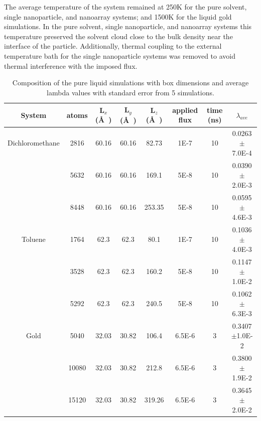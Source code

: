 The average temperature of the system remained at 250K for the pure solvent, single nanoparticle, and nanoarray systems; and 1500K for the liquid gold simulations.
In the pure solvent, single nanoparticle, and nanoarray systems this temperature preserved the solvent cloud close to the bulk density near the interface of the particle.
Additionally, thermal coupling to the external temperature bath for the single nanoparticle systems was removed to avoid thermal interference with the imposed flux.


\begin{landscape}
\begin{table}[]
    \centering
    \caption{Composition of the pure liquid simulations with box dimensions and average lambda values with standard error from 5 simulations.}
    \begin{tabular}{c|c|ccc|c|c|c}
    \toprule
         System& atoms & L$_x$ (\AA\ )&L$_y$ (\AA\ )&L$_z$ (\AA\ )& applied flux& time (ns)&$\lambda_{ave}$ \\
         \hline
         Dichloromethane&2816&60.16&60.16&82.73&1E-7&10&0.0263 $\pm$ 7.0E-4\\
         &5632&60.16&60.16&169.1&5E-8&10&0.0390 $\pm$ 2.0E-3\\
         &8448&60.16&60.16&253.35&5E-8&10&0.0595 $\pm$ 4.6E-3\\
         Toluene& 1764&62.3&62.3&80.1&1E-7&10&0.1036 $\pm$ 4.0E-3\\
          &3528&62.3&62.3&160.2&5E-8&10&0.1147 $\pm$ 1.0E-2\\
          &5292&62.3&62.3&240.5&5E-8&10&0.1062 $\pm$ 6.3E-3\\
         Gold& 5040&32.03&30.82&106.4&6.5E-6&3&0.3407 $\pm$1.0E-2\\
          & 10080&32.03&30.82&212.8&6.5E-6&3&0.3800 $\pm$ 1.9E-2\\
           & 15120&32.03&30.82&319.26&6.5E-6&3&0.3645 $\pm$ 2.0E-2\\
         \bottomrule
    \end{tabular}
    \label{tab:bulk-comp}
\end{table}
\end{landscape}

